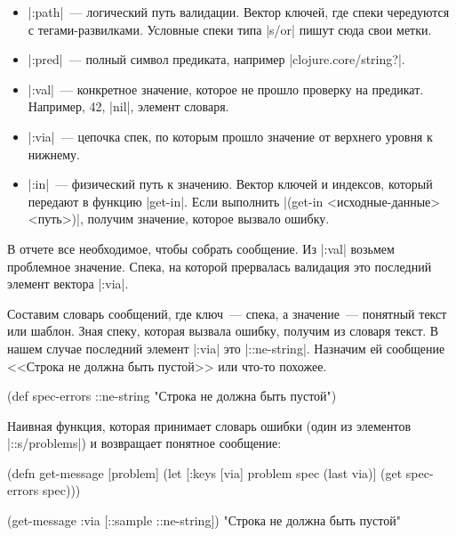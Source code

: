\begin{itemize}

\item
  \spverb|:path|~--- логический путь валидации. Вектор ключей, где спеки чередуются с
  тегами-развилками. Условные спеки типа \spverb|s/or| пишут сюда свои метки.

\item
  \spverb|:pred|~--- полный символ предиката, например \spverb|clojure.core/string?|.

\item
  \spverb|:val|~--- конкретное значение, которое не прошло проверку на
  предикат. Например, 42, \spverb|nil|, элемент словаря.

\item
  \spverb|:via|~--- цепочка спек, по которым прошло значение от верхнего уровня
  к нижнему.

\item
  \spverb|:in|~--- физический путь к значению. Вектор ключей и индексов, который передают
  в функцию \spverb|get-in|. Если выполнить \spverb|(get-in <исходные-данные> <путь>)|,
  получим значение, которое вызвало ошибку.

\end{itemize}

В отчете все необходимое, чтобы собрать сообщение. Из \spverb|:val| возьмем
проблемное значение. Спека, на которой прервалась валидация это последний
элемент вектора \spverb|:via|.

Составим словарь сообщений, где ключ~--- спека, а значение~--- понятный текст
или шаблон. Зная спеку, которая вызвала ошибку, получим из словаря текст. В
нашем случае последний элемент \spverb|:via| это \spverb|::ne-string|. Назначим
ей сообщение <<Строка не должна быть пустой>> или что-то похожее.

  \begin{clojure}
(def spec-errors
  {::ne-string "Строка не должна быть пустой"})
  \end{clojure}

Наивная функция, которая принимает словарь ошибки (один из элементов
\spverb|::s/problems|) и возвращает понятное сообщение:

  \begin{clojure}
(defn get-message [problem]
  (let [{:keys [via]} problem
        spec (last via)]
    (get spec-errors spec)))

(get-message {:via [::sample ::ne-string]})
"Строка не должна быть пустой"
  \end{clojure}

